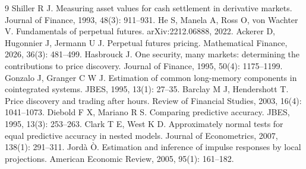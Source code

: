 \documentclass[UTF8,zihao=5,a4paper]{ctexart}
\begin{document}
\vspace{4pt}
\begingroup
\small
\renewcommand{\refname}{\large\bfseries\heiti\color{accent} 参考文献}
\begin{thebibliography}{9}
\setlength{\itemsep}{0.5pt}
\setlength{\parsep}{0pt}
\setlength{\topsep}{1pt}
\setlength{\partopsep}{0pt}
 Shiller R J. Measuring asset values for cash settlement in derivative markets. Journal of Finance, 1993, 48(3): 911--931.
 He S, Manela A, Ross O, von Wachter V. Fundamentals of perpetual futures. arXiv:2212.06888, 2022.
 Ackerer D, Hugonnier J, Jermann U J. Perpetual futures pricing. Mathematical Finance, 2026, 36(3): 481--499.
 Hasbrouck J. One security, many markets: determining the contributions to price discovery. Journal of Finance, 1995, 50(4): 1175--1199.
 Gonzalo J, Granger C W J. Estimation of common long-memory components in cointegrated systems. JBES, 1995, 13(1): 27--35.
 Barclay M J, Hendershott T. Price discovery and trading after hours. Review of Financial Studies, 2003, 16(4): 1041--1073.
 Diebold F X, Mariano R S. Comparing predictive accuracy. JBES, 1995, 13(3): 253--263.
 Clark T E, West K D. Approximately normal tests for equal predictive accuracy in nested models. Journal of Econometrics, 2007, 138(1): 291--311.
 Jordà Ò. Estimation and inference of impulse responses by local projections. American Economic Review, 2005, 95(1): 161--182.
\end{thebibliography}
\endgroup

\clearpage
\appendix
{}
\end{document}
